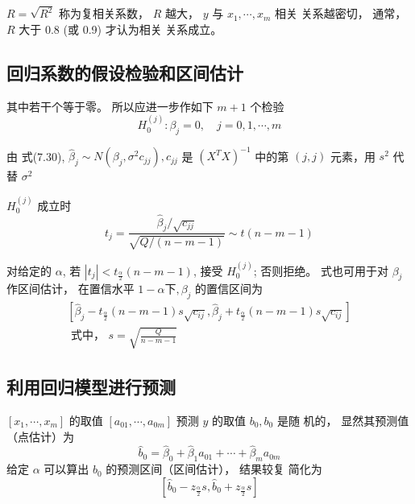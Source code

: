 $  {R}=\sqrt{{R}^{2}}  $ 称为复相关系数， $  {R}  $ 越大， $  {y}  $ 与 $  {x}_{1}, \cdots, {x}_{m}  $ 相关
关系越密切， 通常，  $  {R}  $ 大于 $  0.8  $ (或 0.9) 才认为相关
关系成立。 

\subsection{回归系数的假设检验和区间估计}

其中若干个等于零。 所以应进一步作如下 $  {m}+{1}  $ 个检验
\begin{equation}H_{0}^{(j)}: \beta_{j}=0, \quad j=0,1, \cdots, m \end{equation}

由 式(7.30), $\hat{\beta}_{j} \sim N\left(\beta_{j}, \sigma^{2} c_{j j}\right), c_{j j}$  是 $\left(X^{T} X\right)^{-1}$  中的第 $ (j, j) $ 元素，用 $ s^{2} $ 代替 $ \sigma^{2} $


$  {H}_{0}^{(j)}  $ 成立时
\begin{equation}
t_{j}=\frac{\hat{\beta}_{j} / \sqrt{c_{j j}}}{\sqrt{Q /(n-m-1)}} \sim t(n-m-1)
\end{equation}

对给定的 $ \alpha $, 若 $ \left|t_{j}\right|<t_{\frac{\alpha}{2}}(n-m-1) $, 接受 $ H_{0}^{(j)} $; 否则拒绝。  式也可用于对 $  \beta_{j}  $ 作区间估计， 在置信水平 $  1-\alpha 下, \beta_{j}  $ 的置信区间为
\begin{equation}
\begin{array}{l}
{\left[\hat{\beta}_{j}-t_{\frac{\alpha}{2}}(n-m-1) s \sqrt{c_{i j}}, \hat{\beta}_{j}+t_{\frac{\alpha}{2}}(n-m-1) s \sqrt{c_{i j}}\right]} \\
\text { 式中， } s=\sqrt{\frac{Q}{n-m-1}} 
\end{array}
\end{equation}

\subsection{利用回归模型进行预测}

$  \left[x_{1}, \cdots, x_{m}\right]  $ 的取值 $  \left[a_{01}, \cdots, a_{0 m}\right]  $ 预测 $  y  $ 的取值 $  b_{0}, b_{0}  $ 是随 机的， 显然其预测值（点估计）为
\begin{equation}
\hat{b}_{0}=\hat{\beta}_{0}+\hat{\beta}_{1} a_{01}+\cdots+\hat{\beta}_{m} a_{0 m} 
\end{equation}
给定 $  \alpha  $ 可以算出 $  {b}_{{0}}  $ 的预测区间（区间估计）， 结果较复
简化为
\begin{equation}
\left[\hat{b}_{0}-z_{\frac{\alpha}{2}} s, \hat{b}_{0}+z_{\frac{\alpha}{2}} s\right]
\end{equation}

